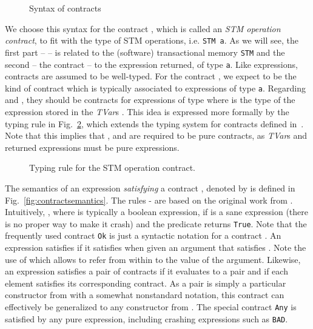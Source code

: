 \documentclass[submission,copyright,creativecommons]{eptcs}
\begin{document}
\begin{figure}[htb]
  \centering
\caption{Syntax of contracts}
  \label{fig:contractsyntax}
\end{figure}

 


We choose this syntax for the contract , which is called an \emph{STM operation contract}, to fit with the type of STM operations, i.e. \texttt{STM a}. As we will see, the first part --  -- is related to the (software) transactional memory \texttt{STM} and the second -- the contract  -- to the expression returned, of type \texttt{a}. 
Like expressions, contracts are assumed to be well-typed. 
For the contract , we expect  to be the kind of contract which is typically associated to expressions of type \texttt{a}. Regarding  and , they should be contracts for expressions of type  where  is the type of the expression stored in the \emph{TVar}s . 
This idea is expressed more formally by the typing rule in Fig.~\ref{fig:typing}, which extends the typing system for contracts defined in~\cite{static-contract-checking-thesis}.
Note that this implies that ,  and  are required to be pure contracts, as \emph{TVar}s and returned expressions must be pure expressions.

\begin{figure}[htb]
  \centering
  
  \caption{Typing rule for the STM operation contract.}
  \label{fig:typing}
\end{figure}




The semantics of an expression  \emph{satisfying} a contract , denoted by  is defined in Fig.~\ref{fig:contractsemantics}. The rules  -  are based on the original work from \cite{static-contract-checking}. 
Intuitively, , where  is typically a boolean expression, if  is a sane expression (there is no proper way to make it crash) and the predicate  returns \texttt{True}. 
Note that the frequently used contract \texttt{Ok} is just a syntactic notation for a contract .
An expression  satisfies  if it satisfies  when given an argument that satisfies . Note the use of  which allows to refer from within  to the value of the argument.
Likewise, an expression  satisfies a pair of contracts if it evaluates to a pair and if each element satisfies its corresponding contract. As a pair is simply a particular constructor from  with a somewhat nonstandard notation, this contract can effectively be generalized to any constructor from . 
The special contract \texttt{Any} is satisfied by any pure expression, including crashing expressions such as \texttt{BAD}. 
\end{document}
